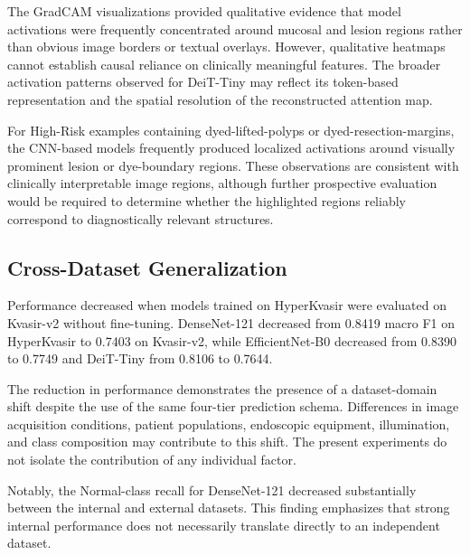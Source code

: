 \documentclass[11pt,a4paper]{article}
\begin{document}
The GradCAM visualizations provided qualitative evidence that model
activations were frequently concentrated around mucosal and lesion regions
rather than obvious image borders or textual overlays. However, qualitative
heatmaps cannot establish causal reliance on clinically meaningful features.
The broader activation patterns observed for DeiT-Tiny may reflect its
token-based representation and the spatial resolution of the reconstructed
attention map.

For High-Risk examples containing dyed-lifted-polyps or
dyed-resection-margins, the CNN-based models frequently produced localized
activations around visually prominent lesion or dye-boundary regions. These
observations are consistent with clinically interpretable image regions,
although further prospective evaluation would be required to determine whether
the highlighted regions reliably correspond to diagnostically relevant
structures.

\subsection{Cross-Dataset Generalization}

Performance decreased when models trained on HyperKvasir were evaluated on
Kvasir-v2 without fine-tuning. DenseNet-121 decreased from 0.8419 macro F1
on HyperKvasir to 0.7403 on Kvasir-v2, while EfficientNet-B0 decreased from
0.8390 to 0.7749 and DeiT-Tiny from 0.8106 to 0.7644.

The reduction in performance demonstrates the presence of a dataset-domain
shift despite the use of the same four-tier prediction schema. Differences in
image acquisition conditions, patient populations, endoscopic equipment,
illumination, and class composition may contribute to this shift. The present
experiments do not isolate the contribution of any individual factor.

Notably, the Normal-class recall for DenseNet-121 decreased substantially
between the internal and external datasets. This finding emphasizes that
strong internal performance does not necessarily translate directly to an
independent dataset.
\end{document}
